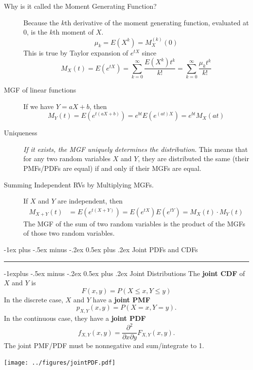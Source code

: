 \documentclass[10pt,landscape]{article}
\makeatletter
\renewcommand{\section}{\@startsection{section}{1}{0mm}%
                                {-1ex plus -.5ex minus -.2ex}%
                                {0.5ex plus .2ex}%
                                {\normalfont\large\bfseries}}
\renewcommand{\subsection}{\@startsection{subsection}{2}{0mm}%
                                {-1explus -.5ex minus -.2ex}%
                                {0.5ex plus .2ex}%
                                {\normalfont\normalsize\bfseries}}
\makeatother
\begin{document}
\begin{multicols*}{3}
\begin{description}
        \item[Why is it called the Moment Generating Function?] Because the $k$th derivative of the moment generating function, evaluated at $0$, is the $k$th moment of $X$.
        \[\mu_k = E(X^k) = M_X^{(k)}(0)\]
        This is true by Taylor expansion of $e^{tX}$ since
        \[M_X(t) = E(e^{tX}) = \sum_{k=0}^\infty \frac{E(X^k)t^k}{k!} = \sum_{k=0}^\infty \frac{\mu_k t^k}{k!} \]
                        
        \item[MGF of linear functions] If we have $Y = aX + b$, then
        \[M_Y(t) = E(e^{t(aX + b)}) =  e^{bt}E(e^{(at)X}) = e^{bt}M_X(at)\]
                               
        \item[Uniqueness] \emph{If it exists, the MGF uniquely determines the distribution}. This means that for any two random variables $X$ and $Y$, they are distributed the same (their PMFs/PDFs are equal) if and only if their MGFs are equal. 
        
        \item[Summing Independent RVs by Multiplying MGFs.] If $X$ and $Y$ are independent, then
        \begin{align*}
            M_{X+Y}(t) & = E(e^{t(X + Y)}) = E(e^{tX})E(e^{tY}) = M_X(t) \cdot M_Y(t) 
        \end{align*}
        The MGF of the sum of two random variables is the product of the MGFs of those two random variables.
    \end{description}
            
    \section{Joint PDFs and CDFs}\smallskip \hrule height 2pt \smallskip
    \subsection{Joint Distributions}
    The \textbf{joint CDF} of $X$ and $Y$ is 
    $$F(x,y)=P(X \leq x, Y \leq y)$$
    In the discrete case, $X$ and $Y$ have a \textbf{joint PMF} 
    $$p_{X,Y}(x,y) = P(X=x,Y=y).$$ In the continuous case, they have a \textbf{joint PDF}
    \[f_{X,Y}(x,y) = \frac{\partial^2}{\partial x \partial y} F_{X,Y}(x,y).\]
    The joint PMF/PDF must be nonnegative and sum/integrate to 1.
    \begin{minipage}{\linewidth}
        \centering
        \texttt{[image: ../figures/jointPDF.pdf]}
    \end{minipage}
    

\end{multicols*}
\end{document}
